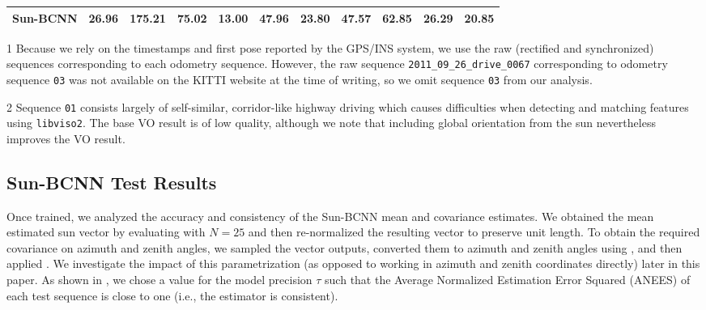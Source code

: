 \begin{table}[]
{\begin{threeparttable}
\begin{tabular}{@{}lcccccccccc@{}}
\quad Sun-BCNN    & 26.96          & \textbf{175.21} & 75.02          & 13.00          & \textbf{47.96} & 23.80          & \textbf{47.57} & 62.85          & 26.29          & 20.85          \\ \bottomrule
\end{tabular}
\begin{tablenotes}
	\item[1] Because we rely on the timestamps and first pose reported by the GPS/INS system, we use the raw (rectified and synchronized) sequences corresponding to each odometry sequence. However, the raw sequence \texttt{2011\_09\_26\_drive\_0067} corresponding to odometry sequence \texttt{03} was not available on the KITTI website at the time of writing, so we omit sequence \texttt{03} from our analysis.
    \item[2] Sequence \texttt{01} consists largely of self-similar, corridor-like highway driving which causes difficulties when detecting and matching features using \texttt{libviso2}. The base VO result is of low quality, although we note that including global orientation from the sun nevertheless improves the VO result.
\end{tablenotes}
\end{threeparttable}
}
\end{table}

\subsection{Sun-BCNN Test Results}
Once trained, we analyzed the accuracy and consistency of the Sun-BCNN mean and covariance estimates.
We obtained the mean estimated sun vector by evaluating  with $N=25$ and then re-normalized the resulting vector to preserve unit length. 
To obtain the required covariance on azimuth and zenith angles, we sampled the vector outputs, converted them to azimuth and zenith angles using , and then applied .
We investigate the impact of this parametrization (as opposed to working in azimuth and zenith coordinates directly) later in this paper.
As shown in , we chose a value for the model precision $\tau$ such that the Average Normalized Estimation Error Squared (ANEES) of each test sequence is close to one (i.e., the estimator is consistent).

